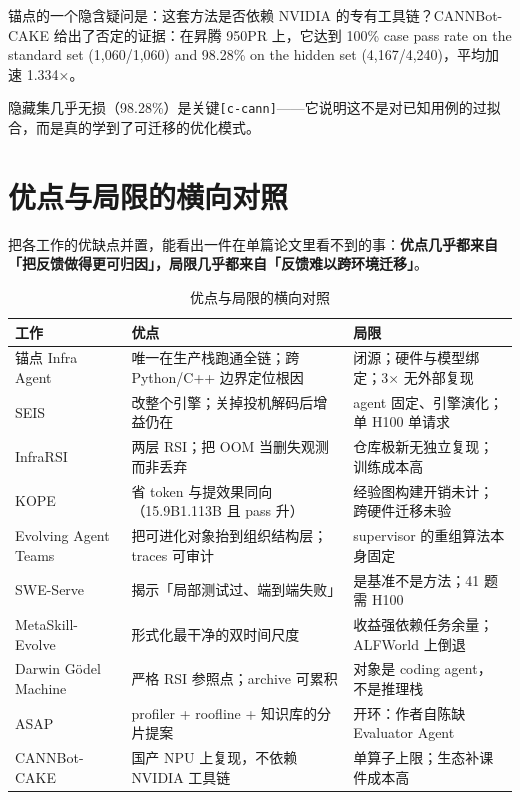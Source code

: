 锚点的一个隐含疑问是：这套方法是否依赖 NVIDIA 的专有工具链？CANNBot-CAKE 给出了否定的证据：在昇腾 950PR 上，它达到 100\% case pass rate on the standard set (1,060/1,060) and 98.28\% on the hidden set (4,167/4,240)，平均加速 1.334×。


隐藏集几乎无损（98.28\%）是关键{\scriptsize\texttt{[c-\hspace{0pt}cann]}}——它说明这不是对已知用例的过拟合，而是真的学到了可迁移的优化模式。



\section{优点与局限的横向对照}

把各工作的优缺点并置，能看出一件在单篇论文里看不到的事：\textbf{优点几乎都来自「把反馈做得更可归因」，局限几乎都来自「反馈难以跨环境迁移」}。


\begin{table}[t]
\centering
\footnotesize
\setlength{\tabcolsep}{4pt}
\caption{优点与局限的横向对照}
\label{tab:5}
\begin{tabularx}{\textwidth}{lXl}
\toprule
工作 & 优点 & 局限 \\
\midrule
锚点 Infra Agent & 唯一在生产栈跑通全链；跨 Python/C++ 边界定位根因 & 闭源；硬件与模型绑定；3× 无外部复现 \\
SEIS & 改整个引擎；关掉投机解码后增益仍在 & agent 固定、引擎演化；单 H100 单请求 \\
InfraRSI & 两层 RSI；把 OOM 当删失观测而非丢弃 & 仓库极新无独立复现；训练成本高 \\
KOPE & 省 token 与提效果同向（15.9B\sym{→}{}1.113B 且 pass 升） & 经验图构建开销未计；跨硬件迁移未验 \\
Evolving Agent Teams & 把可进化对象抬到组织结构层；traces 可审计 & supervisor 的重组算法本身固定 \\
SWE-Serve & 揭示「局部测试过、端到端失败」 & 是基准不是方法；41 题需 H100 \\
MetaSkill-Evolve & 形式化最干净的双时间尺度 & 收益强依赖任务余量；ALFWorld 上倒退 \\
Darwin Gödel Machine & 严格 RSI 参照点；archive 可累积 & 对象是 coding agent，不是推理栈 \\
ASAP & profiler + roofline + 知识库的分片提案 & 开环：作者自陈缺 Evaluator Agent \\
CANNBot-CAKE & 国产 NPU 上复现，不依赖 NVIDIA 工具链 & 单算子上限；生态补课件成本高 \\
\bottomrule
\end{tabularx}
\end{table}

